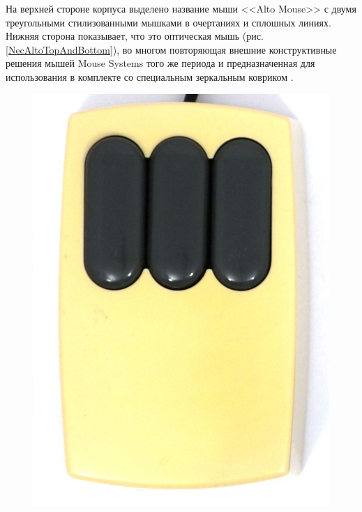\documentclass[11pt, a4paper]{article}
\begin{document}
На верхней стороне корпуса выделено название мыши <<Alto Mouse>> с двумя треугольными стилизованными мышками в очертаниях и сплошных линиях. Нижняя сторона показывает, что это оптическая мышь (рис. \ref{NecAltoTopAndBottom}), во многом повторяющая внешние конструктивные решения мышей Mouse Systems того же периода и предназначенная для использования в комплекте со специальным зеркальным ковриком \cite{photo}.

\begin{figure}[h]
    \centering
    \includegraphics[scale=0.4]{1981_xerox_alto_mouse/top_30.jpg}

\end{figure}
\end{document}
